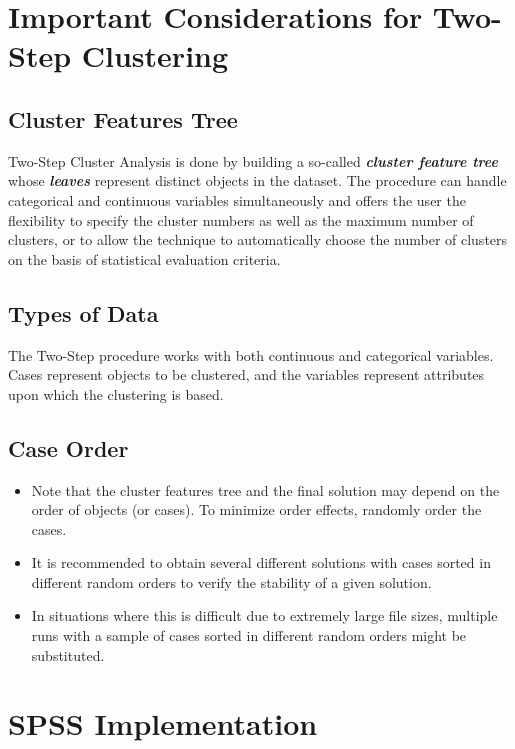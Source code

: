 \documentclass[a4paper,12pt]{article}
\begin{document}
\section{Important Considerations for Two-Step Clustering}
\subsection{Cluster Features Tree}

Two-Step Cluster Analysis is done by building a so-called \textbf{\textit{cluster feature tree}} whose \textbf{\textit{leaves}} represent distinct objects in the dataset. The procedure can handle categorical and continuous variables simultaneously and offers the user the flexibility to specify the cluster numbers as well as the maximum number of clusters, or to allow the technique to automatically choose the number of clusters on the basis of statistical evaluation criteria.



\subsection{Types of Data} The Two-Step procedure works with both continuous and categorical variables. Cases represent objects to be clustered, and the variables represent attributes upon which the clustering is based.

\subsection{Case Order}
\begin{itemize}
    \item Note that the cluster features tree and the final solution may depend on the order of objects (or cases). To minimize order effects, randomly order the cases. 
    \item It is recommended to obtain several different solutions with cases sorted in different random orders to verify the stability of a given solution. 
    \item In situations where this is difficult due to extremely large file sizes, multiple runs with a sample of cases sorted in different random orders might be substituted.
\end{itemize}


\section{SPSS Implementation}
\end{document}
